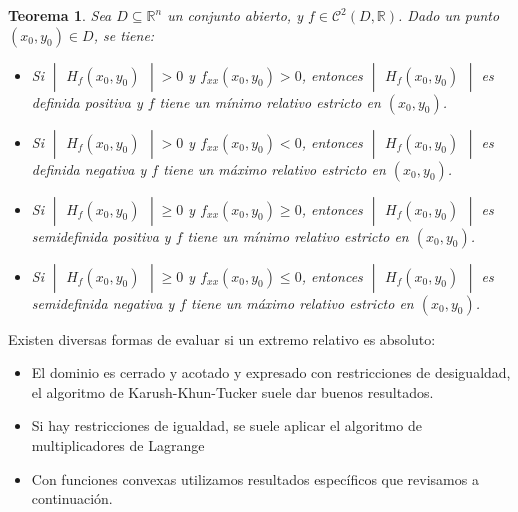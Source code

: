 \documentclass[a4paper,11pt]{article}
\newtheorem{theorem}{Teorema}
\begin{document}
\begin{theorem}
Sea $D\subseteq \mathbb{R}^n$ un conjunto abierto, y $f\in\mathcal{C}^2(D,\mathbb{R})$. Dado un punto $(x_0,y_0)\in D$, se tiene:
\begin{itemize}
    \item Si $\begin{vmatrix}H_f(x_0,y_0)\end{vmatrix}>0$ y $ f_{xx}(x_0,y_0)>0$, entonces $\begin{vmatrix}H_f(x_0,y_0)\end{vmatrix}$ es definida positiva
y $f$ tiene un mínimo relativo estricto en $(x_0, y_0)$.
    \item Si $\begin{vmatrix}H_f(x_0,y_0)\end{vmatrix}>0$ y $ f_{xx}(x_0,y_0)<0$, entonces $\begin{vmatrix}H_f(x_0,y_0)\end{vmatrix}$ es definida negativa
y $f$ tiene un máximo relativo estricto en $(x_0, y_0)$.
    \item Si $\begin{vmatrix}H_f(x_0,y_0)\end{vmatrix}\geq0$ y $ f_{xx}(x_0,y_0)\geq0$, entonces $\begin{vmatrix}H_f(x_0,y_0)\end{vmatrix}$ es semidefinida positiva
y $f$ tiene un mínimo relativo estricto en $(x_0, y_0)$.
  \item Si $\begin{vmatrix}H_f(x_0,y_0)\end{vmatrix}\geq0$ y $ f_{xx}(x_0,y_0)\leq0$, entonces $\begin{vmatrix}H_f(x_0,y_0)\end{vmatrix}$ es semidefinida negativa 
y $f$ tiene un máximo relativo estricto en $(x_0, y_0)$.
\end{itemize}

\end{theorem}
\noindent
Existen diversas formas de evaluar si un extremo relativo es absoluto:

\begin{itemize}
\item El dominio es cerrado y acotado y expresado con restricciones de desigualdad, el algoritmo de Karush-Khun-Tucker suele dar buenos resultados.
\item Si hay restricciones de igualdad, se suele aplicar el algoritmo de multiplicadores de Lagrange
\item Con funciones convexas utilizamos resultados específicos que revisamos a
continuación.

\end{itemize}
\end{document}
